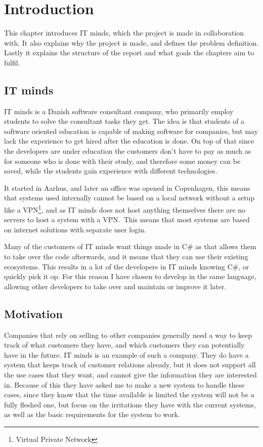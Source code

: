 \chapter{Introduction}
\label{chap:Introduction}
This chapter introduces IT minds, which the project is made in collaboration
with. It also explains why the project is made, and defines the problem
definition. Lastly it explains the structure of the report and what goals the
chapters aim to fulfil. 

\section{IT minds}
\label{sec:IT minds}
IT minds is a Danish software consultant company\cite{IT-minds}, who primarily
employ students to solve the consultant tasks they get. The idea is that
students of a software oriented education is capable of making software for
companies, but may lack the experience to get hired after the education is done.
On top of that since the developers are under education the customers don't have
to pay as much as for someone who is done with their study, and therefore some
money can be saved, while the students gain experience with different technologies. 

It started in Aarhus, and later an office was opened in Copenhagen, this means
that systems used internally cannot be based on a local network without a setup
like a VPN\footnote{Virtual Private Network}, and as IT minds does not host
anything themselves there are no servers to host a system with a VPN.\ This means
that most systems are based on internet solutions with separate user login. 

Many of the customers of IT minds want things made in C\# as that allows them
to take over the code afterwards, and it means that they can use their existing
ecosystems. This results in a lot of the developers in IT minds knowing C\#,
or quickly pick it op. For this reason I have chosen to develop in the same
language, allowing other developers to take over and maintain or improve it later. 

\section{Motivation}
\label{sec:Motivation}
Companies that rely on selling to other companies generally need a way to keep
track of what customers they have, and which customers they can potentially have
in the future. IT minds is an example of such a company. They do have a system
that keeps track of customer relations already, but it does not support all the
use cases that they want, and cannot give the information they are interested
in. Because of this they have asked me to make a new system to handle these
cases, since they know that the time available is limited the system will
not be a fully fleshed one, but focus on the irritations they have with the
current systems, as well as the basic requirements for the system to work. 

